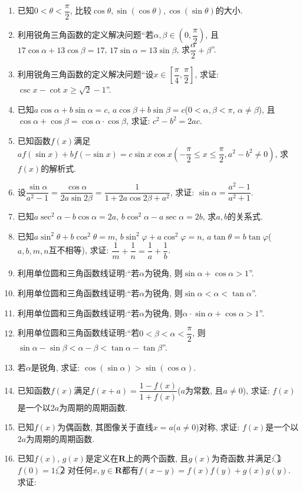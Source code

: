 \documentclass[10pt,a4paper]{article}
\begin{document}
\begin{enumerate}[1.]
\item 已知$0<\theta <\dfrac{\pi}2$, 比较$\cos \theta ,\sin (\cos \theta),\cos (\sin \theta)$的大小.
\item 利用锐角三角函数的定义解决问题``若$\alpha ,\beta \in (0,\dfrac{\pi}2)$, 且$17\cos \alpha +13\cos \beta =17$, $17\sin \alpha =13\sin \beta$, 求$\dfrac{\alpha}2+\beta$''.
\item 利用锐角三角函数的定义解决问题``设$x\in [\dfrac{\pi}4,\dfrac{\pi}2]$, 求证: $\csc x-\cot x\ge \sqrt 2-1$''.
\item 已知$a\cos \alpha +b\sin \alpha =c$, $a\cos \beta +b\sin \beta =c$($0<\alpha ,\beta <\pi$, $\alpha \ne \beta$), 且$\cos \alpha +\cos \beta =\cos \alpha \cdot \cos \beta$, 求证: $c^2-b^2=2ac$.
\item 已知函数$f(x)$满足$af(\sin x)+bf(-\sin x)=c\sin x\cos x(-\dfrac{\pi}2\le x\le \dfrac{\pi}2,a^2-b^2\ne 0)$, 求$f(x)$的解析式.
\item 设$\dfrac{\sin \alpha}{a^2-1}=\dfrac{\cos \alpha}{2a\sin 2\beta}=\dfrac 1{1+2a\cos 2\beta +a^2}$, 求证: $\sin \alpha =\dfrac{a^2-1}{a^2+1}$.
\item 已知$a\sec ^2\alpha -b\cos \alpha =2a$, $b\cos ^2\alpha -a\sec \alpha =2b$, 求$a,b$的关系式.
\item 已知$a\sin ^2\theta +b\cos ^2\theta =m$, $b\sin ^2\varphi +a\cos ^2\varphi =n$, $a\tan \theta =b\tan \varphi$($a,b,m,n$互不相等), 求证: $\dfrac 1m+\dfrac 1n=\dfrac 1a+\dfrac 1b$.
\item 利用单位圆和三角函数线证明:``若$\alpha$为锐角, 则$\sin \alpha +\cos \alpha >1$''.
\item 利用单位圆和三角函数线证明:``若$\alpha$为锐角, 则$\sin \alpha <\alpha <\tan \alpha$''.
\item 利用单位圆和三角函数线证明:``若$\alpha$为锐角, 则$\alpha \cdot \sin \alpha +\cos \alpha >1$''.
\item 利用单位圆和三角函数线证明:``若$0<\beta <\alpha <\dfrac{\pi}2$, 则$\sin \alpha -\sin \beta <\alpha -\beta <\tan \alpha -\tan \beta$''.
\item 若$\alpha$是锐角, 求证: $\cos (\sin \alpha)>\sin (\cos \alpha)$.
\item 已知函数$f(x)$满足$f(x+a)=\dfrac{1-f(x)}{1+f(x)}$($a$为常数, 且$a\ne 0$), 求证: $f(x)$是一个以$2a$为周期的周期函数.
\item 已知$f(x)$为偶函数, 其图像关于直线$x=a$($a\ne 0$)对称, 求证: $f(x)$是一个以$2a$为周期的周期函数.
\item 已知$f(x)$, $g(x)$是定义在$\mathbf{R}$上的两个函数, 且$g(x)$为奇函数.并满足: \textcircled{1} $f(0)=1$; \textcircled{2} 对任何$x,y\in \mathbf{R}$都有$f(x-y)=f(x)f(y)+g(x)g(y)$. 求证:\\

\end{enumerate}
\end{document}

